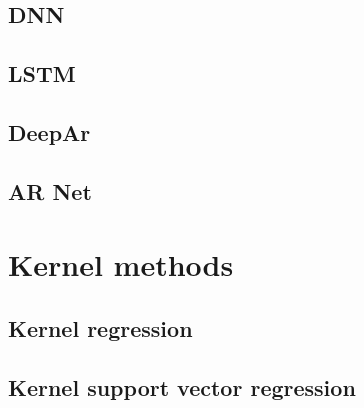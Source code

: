 \subsection{DNN}
\subsection{LSTM}
\subsection{DeepAr}
\subsection{AR Net}

\section{Kernel methods}
\subsection{Kernel regression}
\subsection{Kernel support vector regression}
